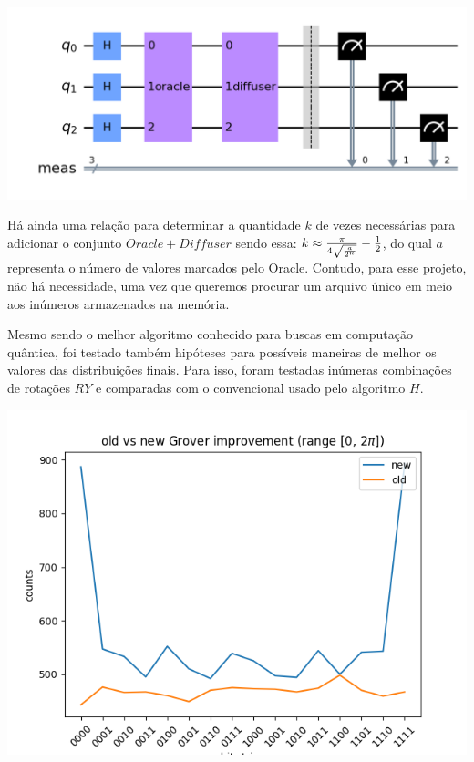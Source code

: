 \documentclass{article}
\begin{document}
\begin{center}
	\includegraphics[scale=0.3]{Grover.png}
	\label{fig:grover-default-circuit}
\end{center}

Há ainda uma relação para determinar a quantidade $k$ de vezes necessárias para adicionar o conjunto $Oracle + Diffuser$ sendo essa: $k \approx { {\pi \over {4 \sqrt{a\over{2^n}}}} - {1\over2}  }$, do qual $a$ representa o número de valores marcados pelo Oracle. Contudo, para esse projeto, não há necessidade, uma vez que queremos procurar um arquivo único em meio aos inúmeros armazenados na memória.

Mesmo sendo o melhor algoritmo conhecido para buscas em computação quântica, foi testado também hipóteses para possíveis maneiras de melhor os valores das distribuições finais. Para isso, foram testadas inúmeras combinações de rotações $RY$ e comparadas com o convencional usado pelo algoritmo $H$.

\begin{center}
	\includegraphics[scale=0.5]{improvement-grover-algorithm-4bits-0-to-2pi.png}
	\label{fig:best-angle-grover}
\end{center}
\end{document}

